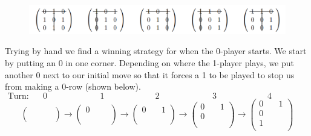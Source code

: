 \documentclass[11pt]{article}
\newcommand{\keywordfont}{\textsc}
\newcommand{\keyword}[1]{%
  \marginpar{\raggedright\small\keywordfont{#1}}}
\begin{document}
\begin{figure}[h] %
   \centering
   \includegraphics[width=6.2in]{cofactors.png}
   \label{myfig}
\end{figure}

Trying by hand \keyword{Try} we find a winning strategy for when the 0-player starts. We start by putting an 0 in one corner. Depending on where the 1-player plays, we put another 0 next to our initial move so that it forces a 1 to be played to stop us from making a 0-row (shown below). 
\[
\text{Turn:} \hspace{20pt} 0 \hspace{75pt} 1 \hspace{72pt} 2 \hspace{75pt} 3 \hspace{72pt} 4 \hspace{50pt}
\]
\[ \left( \begin{array}{ccc}
\ & \ & \ \\
\ & \ & \ \\
\ & \ & \ \\
\end{array} \right)
\rightarrow
%
\left( \begin{array}{ccc}
0 & \ & \ \\
\ & \ & \ \\
\ & \ & \ \\
\end{array} \right)
\rightarrow
%
\left( \begin{array}{ccc}
0 & \ & 1 \\
\ & \ & \ \\
\ & \ & \ \\
\end{array} \right)
\rightarrow
%
\left( \begin{array}{ccc}
0 & \ & 1 \\
0 & \ & \ \\
\ & \ & \ \\
\end{array} \right)
\rightarrow
%
\left( \begin{array}{c|cc}
0 & \ & 1 \\
0 & \ & \ \\
\hline
1 & \ & \ \\
\end{array} \right)
\]
\end{document}
